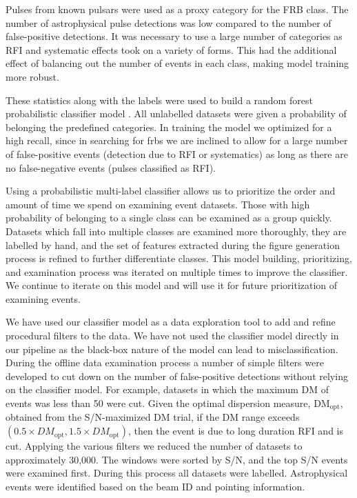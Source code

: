 \documentclass[a4paper,fleqn,usenatbib]{mnras}
\begin{document}
Pulses from known pulsars were used as a proxy category for the FRB class. The
number of astrophysical pulse detections was low compared to the number of
false-positive detections. It was necessary to use a large number of categories
as RFI and systematic effects took on a variety of forms.  This had the
additional effect of balancing out the number of events in each class, making
model training more robust.

These statistics along with the labels were used to build a random forest
probabilistic classifier model \citep{Ho:1995:RDF:844379.844681,Breiman2001}.
All unlabelled datasets were given a probability of belonging the predefined
categories. In training the model we optimized for a high recall, since in
searching for \glspl{frb} we are inclined to allow for a large number of
false-positive events (detection due to RFI or systematics) as long as there are
no false-negative events (pulses classified as RFI).

Using a probabilistic multi-label classifier allows us to prioritize the order
and amount of time we spend on examining event datasets. Those with high
probability of belonging to a single class can be examined as a group quickly.
Datasets which fall into multiple classes are examined more thoroughly, they are
labelled by hand, and the set of features extracted during the figure generation
process is refined to further differentiate classes. This model building,
prioritizing, and examination process was iterated on multiple times to improve
the classifier. We continue to iterate on this model and will use it for future
prioritization of examining events.

We have used our classifier model as a data exploration tool to add and refine
procedural filters to the data. We have not used the classifier model directly
in our pipeline as the black-box nature of the model can lead to
misclassification.  During the offline data examination process a number of
simple filters were developed to cut down on the number of false-positive
detections without relying on the classifier model. For example, datasets in
which the maximum DM of events was less than 50 were cut.  Given the optimal
dispersion measure, DM$_{\textrm{opt}}$, obtained from the S/N-maximized DM
trial,  if the DM range exceeds $(0.5 \times DM_{\textrm{opt}}, 1.5 \times
DM_{\textrm{opt}})$, then the event is due to long duration RFI and is cut.
Applying the various filters we reduced the number of datasets to approximately
30,000. The windows were sorted by S/N, and the top S/N events were examined
first.  During this process all datasets were labelled.  Astrophysical events
were identified based on the beam ID and pointing information.
\end{document}
